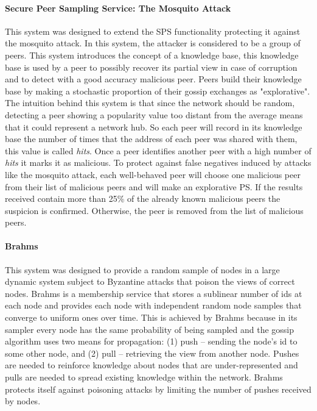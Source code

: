 \paragraph*{\textbf{Secure Peer Sampling Service: The Mosquito Attack} \cite{jesi2009secure}} This system was designed to extend the SPS functionality protecting it against the mosquito attack. In this system, the attacker is considered to be a group of peers. This system introduces the concept of a knowledge base, this knowledge base is used by a peer to possibly recover its partial view in case of corruption and to detect with a good accuracy malicious peer. Peers build their knowledge base by making a stochastic proportion of their gossip exchanges as "explorative". The intuition behind this system is that since the network should be random, detecting a peer showing a popularity value too distant from the average means that it could represent a network hub. So each peer will record in its knowledge base the number of times that the address of each peer was shared with them, this value is called \textit{hits}. Once a peer identifies another peer with a high number of \textit{hits} it marks it as malicious. To protect against false negatives induced by attacks like the mosquito attack, each well-behaved peer will choose one malicious peer from their list of malicious peers and will make an explorative PS. If the results received contain more than 25\% of the already known malicious peers the suspicion is confirmed. Otherwise, the peer is removed from the list of malicious peers.

\paragraph*{\textbf{Brahms} \cite{bortnikov2009brahms}} This system was designed to provide a random sample of nodes in a large dynamic system subject to Byzantine attacks that poison the views of correct nodes. Brahms is a membership service that stores a sublinear number of ids at each node and provides each node with independent random node samples that converge to uniform ones over time. This is achieved by Brahms because in its sampler every node has the same probability of being sampled and the gossip algorithm uses two means for propagation: (1) push – sending the node’s id to some other node, and (2) pull – retrieving the view from another node. Pushes are needed to reinforce knowledge about nodes that are under-represented and pulls are needed to spread existing knowledge within the network. Brahms protects itself against poisoning attacks by limiting the number of pushes received by nodes.

